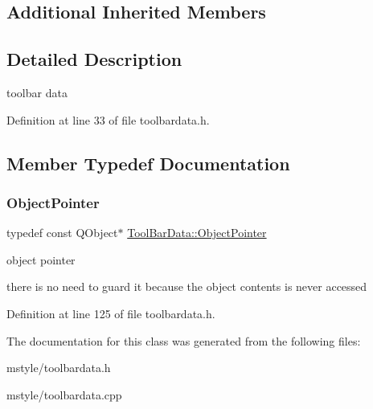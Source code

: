 \subsection*{Additional Inherited Members}


\subsection{Detailed Description}
toolbar data 

Definition at line 33 of file toolbardata.\+h.



\subsection{Member Typedef Documentation}
\mbox{\label{class_tool_bar_data_a0cdad07ed8a8ca873e2fa53ef19de613}} 
\subsubsection{\texorpdfstring{Object\+Pointer}{ObjectPointer}}
{\footnotesize\ttfamily typedef const Q\+Object$\ast$ \hyperlink{class_tool_bar_data_a0cdad07ed8a8ca873e2fa53ef19de613}{Tool\+Bar\+Data\+::\+Object\+Pointer}\hspace{0.3cm}{\ttfamily [protected]}}



object pointer 

there is no need to guard it because the object contents is never accessed 

Definition at line 125 of file toolbardata.\+h.



The documentation for this class was generated from the following files\+:\begin{DoxyCompactItemize}
\item 
mstyle/toolbardata.\+h\item 
mstyle/toolbardata.\+cpp\end{DoxyCompactItemize}

